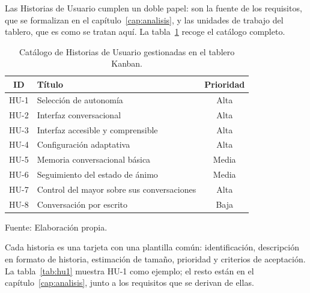 Las Historias de Usuario cumplen un doble papel: son la fuente de los requisitos, que se formalizan en el capítulo~\ref{cap:analisis}, y las unidades de trabajo del tablero, que es como se tratan aquí. La tabla~\ref{tab:catalogo-hu} recoge el catálogo completo.

\begin{table}[htbp]
    \centering
    \caption{Catálogo de Historias de Usuario gestionadas en el tablero Kanban.}
    \label{tab:catalogo-hu}
    \begin{tabularx}{\textwidth}{@{}c >{\RaggedRight\arraybackslash}X c@{}}
        \toprule
        \textbf{ID} & \textbf{Título} & \textbf{Prioridad} \\
        \midrule
        HU-1 & Selección de autonomía              & Alta  \\
        HU-2 & Interfaz conversacional             & Alta  \\
        HU-3 & Interfaz accesible y comprensible   & Alta  \\
        HU-4 & Configuración adaptativa            & Alta  \\
        HU-5 & Memoria conversacional básica       & Media \\
        HU-6 & Seguimiento del estado de ánimo     & Media \\
        HU-7 & Control del mayor sobre sus conversaciones & Alta \\
        HU-8 & Conversación por escrito            & Baja \\
        \bottomrule
    \end{tabularx}

    \vspace{2pt}
    {\footnotesize Fuente: Elaboración propia.}
\end{table}

Cada historia es una tarjeta con una plantilla común: identificación, descripción en formato de historia, estimación de tamaño, prioridad y criterios de aceptación. La tabla~\ref{tab:hu1} muestra HU-1 como ejemplo; el resto están en el capítulo~\ref{cap:analisis}, junto a los requisitos que se derivan de ellas.


